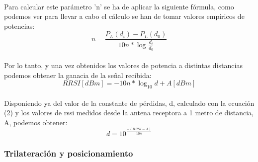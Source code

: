 \documentclass[a4paper ,12pt, onecolumn]{article}
\begin{document}
                \paragraph{}
                Para calcular este parámetro 'n' se ha de aplicar la siguiente fórmula, como podemos ver para llevar a cabo el 
                cálculo se han de tomar valores empíricos de potencias:
                \begin{equation}
                    n = \frac{ P_L(d_i) - P_L(d_0) }{10n*\log_{}\frac{d_i}{d_0}}
                \end{equation}
                \paragraph{}
                Por lo tanto, y una vez obtenidos los valores de potencia a distintas distancias podemos obtener la ganacia
                de la señal recibida:
                \begin{equation}
                    RRSI [dBm] = -10n*\log_{10} d+ A[dBm]
                \end{equation}
                \paragraph{}
                Disponiendo ya del valor de la constante de pérdidas, d, calculado con la ecuación (2) y los valores
                de rssi medidos desde la antena receptora a 1 metro de distancia, A, podemos obtener:
                \begin{equation}
                    d= 10^\frac{-(RRSI - A)}{10n}
                \end{equation}
            \subsubsection{Trilateración y posicionamiento}
            
\end{document}
